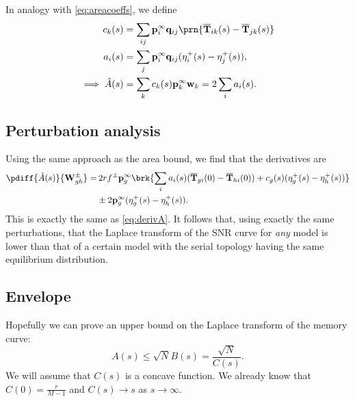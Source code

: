 \documentclass[12pt]{article}
\newcommand{\eq}{\mathbf{p}^\infty}
\newcommand{\fpt}{\mathbf{T}}
\newcommand{\fptb}{\overline{\fpt}}
\newcommand{\w}{\mathbf{w}}
\newcommand{\W}{\mathbf{W}}
\newcommand{\enc}{\mathbf{q}}
\begin{document}
In analogy with \eqref{eq:areacoeffs}, we define
%
\begin{equation}\label{eq:lareacoeffs}
  \begin{aligned}
    c_k(s) &= \sum_{ij} \eq_i \enc_{ij} \prn{\fptb_{ik}(s)-\fptb_{jk}(s)} \\
    a_i(s) &= \sum_j \eq_i \enc_{ij} (\eta^+_{i}(s) - \eta^+_{j}(s)),\\
    \implies
    \hat{A}(s) &= \sum_k c_k(s) \eq_k \w_k
      = 2\sum_i a_i(s).
  \end{aligned}
\end{equation}
%

\subsection{Perturbation analysis}\label{sec:lpert}

Using the same approach as the area bound, we find that the derivatives are
%
\begin{equation}\label{eq:lAdiff}
\begin{aligned}
  \pdiff{\hat{A}(s)}{\W^\pm_{gh}}
     =&\, 2rf^\pm \eq_g \brk{ \sum_i a_i(s) (\fptb_{gi}(0)-\fptb_{hi}(0))
     +c_g(s) (\eta^+_g(s) - \eta^+_h(s)) } \\
     &\pm 2\eq_g (\eta^+_g(s) - \eta^+_h(s)).
\end{aligned}
\end{equation}
%
This is exactly the same as \eqref{eq:derivA}.
It follows that, using exactly the same perturbations, that the Laplace transform of the SNR curve for \emph{any} model is lower than that of a certain model with the serial topology having the same equilibrium distribution.



\subsection{Envelope}\label{sec:env}

Hopefully we can prove an upper bound on the Laplace transform of the memory curve:
%
\begin{equation}\label{eq:lbound}
  A(s) \leq \sqrt{N}B(s) = \frac{\sqrt{N}}{C(s)}.
\end{equation}
%
We will assume that $C(s)$ is a concave function.
We already know that $C(0)=\frac{r}{M-1}$ and $C(s) \to s$ as $s\to\infty$.
\end{document}
